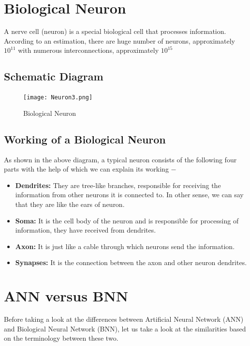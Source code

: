 \documentclass{report}
\begin{document}
\section{Biological Neuron}
A nerve cell (neuron) is a special biological cell that processes information. According to an estimation, there are huge number of neurons, approximately $10^{11}$ with numerous interconnections, approximately $10^{15}$
\subsection{Schematic Diagram}

\begin{figure}[htp]
\centering
\texttt{[image: Neuron3.png]}
\caption{Biological Neuron}
\label{fig5}
\end{figure}

\subsection{Working of a Biological Neuron}

As shown in the above diagram, a typical neuron consists of the following four parts with the help of which we can explain its working −

\begin{itemize}
\item \textbf{Dendrites: } They are tree-like branches, responsible for receiving the information from other neurons it is connected to. In other sense, we can say that they are like the ears of neuron.

\item \textbf{Soma: } It is the cell body of the neuron and is responsible for processing of information, they have received from dendrites.

\item \textbf{Axon: } It is just like a cable through which neurons send the information.

\item \textbf{Synapses: } It is the connection between the axon and other neuron dendrites.

\end{itemize}

\section{ANN versus BNN}
Before taking a look at the differences between Artificial Neural Network (ANN) and Biological Neural Network (BNN), let us take a look at the similarities based on the terminology between these two.
\end{document}

